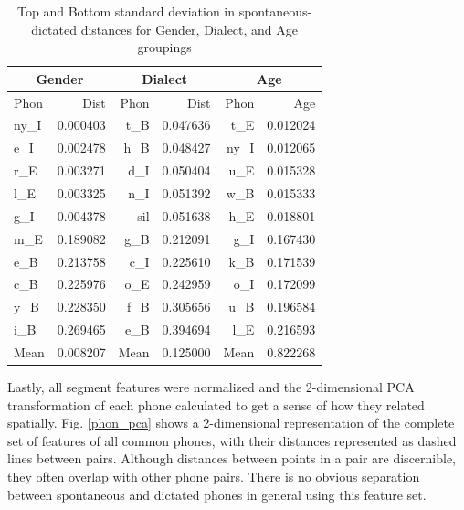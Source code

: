 \documentclass[conference]{IEEEtran}
\begin{document}
\begin{table}[!htb]
\renewcommand{\arraystretch}{1.3}
    \caption{Top and Bottom standard deviation in spontaneous-dictated distances for Gender, Dialect, and Age groupings}
\label{group_dist}
\centering
\begin{tabular}{|l|r|r|r|r|r|}
    \hline
    \multicolumn{2}{|c|}{\textbf{Gender}} &
    \multicolumn{2}{|c|}{\textbf{Dialect}} &
    \multicolumn{2}{|c|}{\textbf{Age}} \\
    \hline
    Phon & Dist & Phon & Dist & Phon & Age \\
    \hline
    ny\_I &  0.000403 & t\_B  &  0.047636 & t\_E  &  0.012024 \\
    e\_I  &  0.002478 & h\_B  &  0.048427 & ny\_I &  0.012065 \\
    r\_E  &  0.003271 & d\_I  &  0.050404 & u\_E  &  0.015328 \\
    l\_E  &  0.003325 & n\_I  &  0.051392 & w\_B  &  0.015333 \\
    g\_I  &  0.004378 & sil  &  0.051638 & h\_E  &  0.018801 \\
\hline
    m\_E  &  0.189082 & g\_B  &  0.212091 & g\_I  &  0.167430 \\
    e\_B  &  0.213758 & c\_I  &  0.225610 & k\_B  &  0.171539 \\
    c\_B  &  0.225976 & o\_E  &  0.242959 & o\_I  &  0.172099 \\
    y\_B  &  0.228350 & f\_B  &  0.305656 & u\_B  &  0.196584 \\
    i\_B  &  0.269465 & e\_B  &  0.394694 & l\_E  &  0.216593 \\
    \hline
    Mean  &  0.008207 & Mean  &  0.125000 & Mean  &  0.822268 \\
    \hline
\end{tabular}
\end{table}

Lastly, all segment features were normalized and the 2-dimensional PCA transformation of each phone calculated to get a sense of how they related spatially.
Fig. \ref{phon_pca} shows a 2-dimensional representation of the complete set of features of all common phones, with their distances represented as dashed lines between pairs.
Although distances between points in a pair are discernible, they often overlap with other phone pairs.
There is no obvious separation between spontaneous and dictated phones in general using this feature set.
\end{document}
